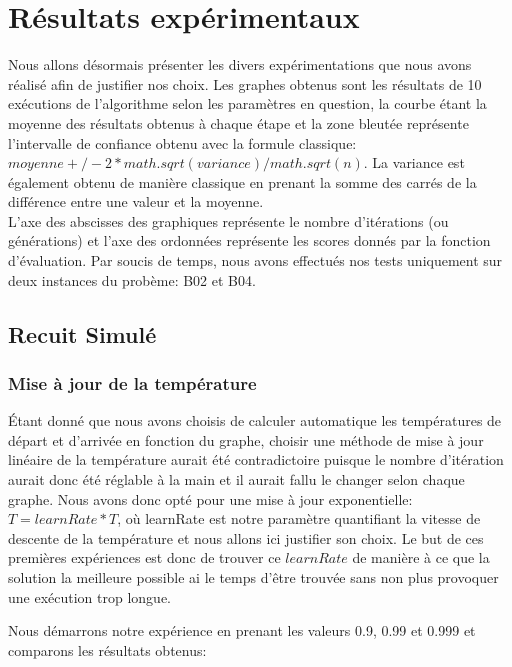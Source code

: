 \documentclass{article}
\begin{document}
\section{Résultats expérimentaux}
Nous allons désormais présenter les divers expérimentations que nous avons réalisé afin de justifier nos choix. Les graphes obtenus sont les résultats de 10 exécutions de l'algorithme selon les paramètres en question, la courbe étant la moyenne des résultats obtenus à chaque étape et la zone bleutée représente l'intervalle de confiance obtenu avec la formule classique: $moyenne +/- 2*math.sqrt(variance)/ math.sqrt(n)$. La variance est également obtenu de manière classique en prenant la somme des carrés de la différence entre une valeur et la moyenne. \\
L'axe des abscisses des graphiques représente le nombre d'itérations (ou générations) et l'axe des ordonnées représente les scores donnés par la fonction d'évaluation. Par soucis de temps, nous avons effectués nos tests uniquement sur deux instances du probème: B02 et B04.

\subsection{Recuit Simulé}

\subsubsection{Mise à jour de la température}
Étant donné que nous avons choisis de calculer automatique les températures de départ et d'arrivée en fonction du graphe, choisir une méthode de mise à jour linéaire de la température aurait été contradictoire puisque le nombre d'itération aurait donc été réglable à la main et il aurait fallu le changer selon chaque graphe. Nous avons donc opté pour une mise à jour exponentielle: $T = learnRate * T$, où learnRate est notre paramètre quantifiant la vitesse de descente de la température et nous allons ici justifier son choix. Le but de ces premières expériences est donc de trouver ce $learnRate$ de manière à ce que la solution la meilleure possible ai le temps d'être trouvée sans non plus provoquer une exécution trop longue. \\ \par

Nous démarrons notre expérience en prenant les valeurs 0.9, 0.99 et 0.999 et comparons les résultats obtenus:
\end{document}
